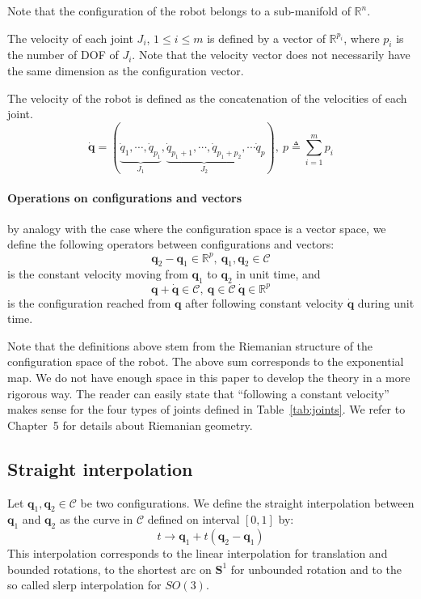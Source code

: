 \documentclass{tADR2e}
\newcommand\real{\mathbb{R}}
\newcommand\CS{\mathcal{C}}
\newcommand\Sone{\mathbf{S}^1}
\newcommand\conf{\mathbf{q}}
\begin{document}
Note that the configuration of the robot belongs to a sub-manifold of $\real^n$.

The velocity of each joint $J_i$, $1\leq i \leq m$ is defined by a vector of $
\real^{p_i}$, where $p_i$ is the number of DOF of $J_i$. Note that 
the velocity vector does not necessarily have the same dimension as the 
configuration vector.

The velocity of the robot is defined as the concatenation of the velocities of 
each joint.
$$\dot{\conf} = (\underbrace{\dot{q}_{1},\cdots,\dot{q}_{p_1}}_{J_1},
\underbrace{\dot{q}_{p_1+1},\cdots,\dot{q}_{p_1+p_2}}_{J_2},\cdots \dot{q}_p),\ p
\triangleq\sum_{i=1}^m p_i$$

\paragraph {Operations on configurations and vectors} by analogy with the case 
where the configuration space is a vector space, we define the following 
operators between configurations and vectors:
$$
\conf_2 - \conf_1 \in \real^p, \ \conf_1, \conf_2\in\CS
$$
is the constant velocity moving from $\conf_1$ to $\conf_2$ in unit time, and
$$
\conf + \dot{\conf}\in\CS, \ \conf\in\CS \ \dot{\conf}\in\real^p
$$
is the configuration reached from $\conf$ after following constant velocity $
\dot{\conf}$ during unit time.

Note that the definitions above stem from the Riemanian structure of the 
configuration space of the robot. The above sum corresponds to the exponential 
map. We do not have enough space in this paper to develop the theory in a more 
rigorous way. The reader can easily state that ``following a 
constant velocity'' makes sense for the four types of joints defined in 
Table~\ref{tab:joints}. We refer to~\cite{riemanian-optim2008} Chapter~5 for 
details about Riemanian geometry.

\subsection {Straight interpolation}

Let $\conf_1, \conf_2\in\CS$ be two configurations. We define the straight 
interpolation between $\conf_1$ and $\conf_2$ as the curve in $\CS$ defined on 
interval $[0,1]$ by:
$$
t \rightarrow \conf_1 + t (\conf_2 - \conf_1)
$$
This interpolation corresponds to the linear interpolation for translation and 
bounded rotations, to the shortest arc on $\Sone$ for unbounded rotation and to 
the so called slerp interpolation for $SO(3)$.
\end{document}
